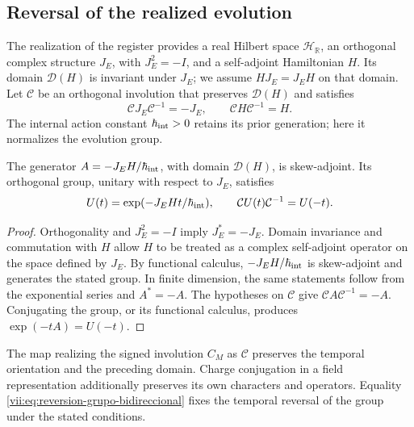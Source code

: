\subsection{Reversal of the realized evolution}
\label{vii:subsec:reversion-evolucion}

The realization of the register provides a real Hilbert space
\(\mathcal H_{\mathbb R}\), an orthogonal complex structure
\(J_E\), with \(J_E^2=-I\), and a self-adjoint Hamiltonian \(H\).
Its domain \(\mathcal D(H)\) is invariant under \(J_E\); we assume
\(HJ_E=J_EH\) on that domain. Let \(\mathcal C\) be an
orthogonal involution that preserves \(\mathcal D(H)\) and satisfies
\begin{equation}
 \mathcal C J_E\mathcal C^{-1}=-J_E,\qquad
 \mathcal C H\mathcal C^{-1}=H.
 \label{vii:eq:dominio-reversion-evolucion}
\end{equation}
The internal action constant \(\hbar_{\rm int}>0\) retains its
prior generation; here it normalizes the evolution group.

\begin{theorem}
\label{vii:thm:reversion-evolucion}
The generator \(A=-J_EH/\hbar_{\rm int}\), with domain \(\mathcal D(H)\),
is skew-adjoint. Its orthogonal group, unitary with respect to \(J_E\), satisfies
\begin{equation}
 U(t)=\exp(-J_EHt/\hbar_{\rm int}),\qquad
 \mathcal C U(t)\mathcal C^{-1}=U(-t).
 \label{vii:eq:reversion-grupo-bidireccional}
\end{equation}
\end{theorem}
\begin{proof}
Orthogonality and \(J_E^2=-I\) imply \(J_E^*=-J_E\).
Domain invariance and commutation with \(H\) allow
\(H\) to be treated as a complex self-adjoint operator on the space defined by
\(J_E\). By functional calculus, \(-J_EH/\hbar_{\rm int}\) is
skew-adjoint and generates the stated group. In finite dimension, the same
statements follow from the exponential series and \(A^*=-A\).
The hypotheses on \(\mathcal C\) give
\(\mathcal C A\mathcal C^{-1}=-A\). Conjugating the group, or its functional
calculus, produces \(\exp(-tA)=U(-t)\).
\end{proof}

The map realizing the signed involution \(C_M\) as \(\mathcal C\)
preserves the temporal orientation and the preceding domain. Charge
conjugation in a field representation additionally preserves its own
characters and operators. Equality
\eqref{vii:eq:reversion-grupo-bidireccional} fixes the temporal reversal
of the group under the stated conditions.

